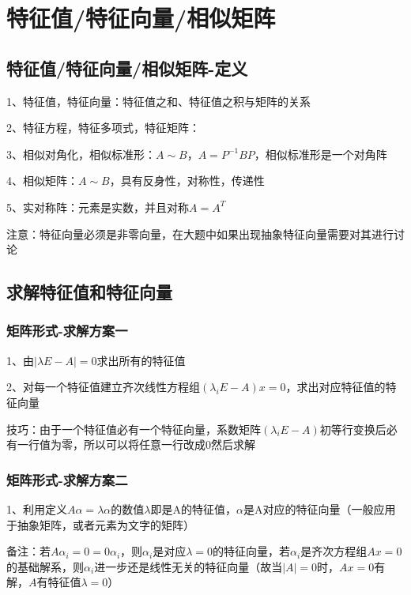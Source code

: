\chapter{特征值/特征向量/相似矩阵}

\section{特征值/特征向量/相似矩阵-定义}

1、特征值，特征向量：特征值之和、特征值之积与矩阵的关系

2、特征方程，特征多项式，特征矩阵：

3、相似对角化，相似标准形：$A \sim B$，$A=P^{-1}BP$，相似标准形是一个对角阵

4、相似矩阵：$A \sim B$，具有反身性，对称性，传递性

5、实对称阵：元素是实数，并且对称$A=A^T$

注意：特征向量必须是非零向量，在大题中如果出现抽象特征向量需要对其进行讨论

\section{求解特征值和特征向量}



\subsection{矩阵形式-求解方案一}

1、由$|\lambda E - A|=0$求出所有的特征值

2、对每一个特征值建立齐次线性方程组$(\lambda _i E - A)x = 0$，求出对应特征值的特征向量

技巧：由于一个特征值必有一个特征向量，系数矩阵$(\lambda _i E - A)$初等行变换后必有一行值为零，所以可以将任意一行改成0然后求解



\subsection{矩阵形式-求解方案二}

1、利用定义$A\alpha=\lambda \alpha$的数值$\lambda$即是A的特征值，$\alpha$是A对应的特征向量（一般应用于抽象矩阵，或者元素为文字的矩阵）

备注：若$A\alpha_i=0=0\alpha_i$，则$\alpha_i$是对应$\lambda=0$的特征向量，若$\alpha_i$是齐次方程组$Ax=0$的基础解系，则$\alpha_i$进一步还是线性无关的特征向量（故当$|A|=0$时，$Ax=0$有解，$A$有特征值$\lambda=0$）



